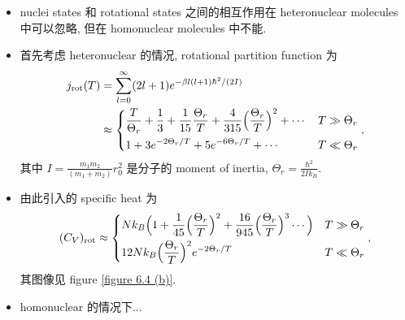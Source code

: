 \begin{itemize}
	\noindent\rule[0.5ex]{\linewidth}{0.5pt} %
	
	\item nuclei states 和 rotational states 之间的相互作用在 heteronuclear molecules 中可以忽略, 但在 homonuclear molecules 中不能.
	
	\item 首先考虑 heteronuclear 的情况, rotational partition function 为
	\begin{align}
		j_\text{rot}(T) &= \sum_{l = 0}^\infty (2 l + 1) e^{- \beta l (l + 1) \hbar^2 / (2 I)} \notag \\
		&\approx \begin{dcases}
			\frac{T}{\Theta_r} + \frac{1}{3} + \frac{1}{15} \frac{\Theta_r}{T} + \frac{4}{315} \Big( \frac{\Theta_r}{T} \Big)^2 + \cdots & T \gg \Theta_r \\
			1 + 3 e^{- 2 \Theta_r / T} + 5 e^{- 6 \Theta_r / T} + \cdots & T \ll \Theta_r
		\end{dcases},
	\end{align}
	其中 $I = \frac{m_1 m_2}{(m_1 + m_2)} r_0^2$ 是分子的 moment of inertia, $\Theta_r = \frac{\hbar^2}{2 I k_B}$.
	
	\item 由此引入的 specific heat 为
	\begin{equation}
		(C_V)_\text{rot} \approx \begin{dcases}
			N k_B \Big( 1 + \frac{1}{45} \Big( \frac{\Theta_r}{T} \Big)^2 + \frac{16}{945} \Big( \frac{\Theta_r}{T} \Big)^3 \cdots \Big) & T \gg \Theta_r \\
			12 N k_B \Big( \frac{\Theta_r}{T} \Big)^2 e^{- 2 \Theta_r / T} & T \ll \Theta_r
		\end{dcases},
	\end{equation}
	其图像见 figure \ref{figure 6.4 (b)}.
	
	\noindent\hdashrule[0.5ex]{\linewidth}{0.5pt}{1mm} %
	
	\item homonuclear 的情况下...
\end{itemize}
